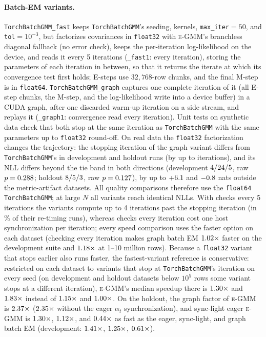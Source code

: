 \documentclass[10pt]{article} %
\newcommand{\egmm}{\textsc{e-GMM}}
\begin{document}
\paragraph{Batch-EM variants.} \texttt{TorchBatchGMM\_fast} keeps \texttt{TorchBatchGMM}'s seeding, kernels, \texttt{max\_iter}$=50$, and \texttt{tol}$=10^{-3}$, but factorizes covariances in \texttt{float32} with \egmm{}'s branchless diagonal fallback (no error check), keeps the per-iteration log-likelihood on the device, and reads it every 5 iterations (\texttt{\_fast1}: every iteration), storing the parameters of each iteration in between, so that it returns the iterate at which its convergence test first holds; E-steps use $32{,}768$-row chunks, and the final M-step is in \texttt{float64}. \texttt{TorchBatchGMM\_graph} captures one complete iteration of it (all E-step chunks, the M-step, and the log-likelihood write into a device buffer) in a CUDA graph, after one discarded warm-up iteration on a side stream, and replays it (\texttt{\_graph1}: convergence read every iteration). Unit tests on synthetic data check that both stop at the same iteration as \texttt{TorchBatchGMM} with the same parameters up to \texttt{float32} round-off. On real data the \texttt{float32} factorization changes the trajectory: the stopping iteration of the graph variant differs from \texttt{TorchBatchGMM}'s in \rXItDiffDev{} development and \rXItDiffHo{} holdout runs (by up to \rXItDiffMax{} iterations), and its NLL differs beyond the tie band in both directions (development $4/24/5$, raw $p = 0.288$; holdout $8/5/3$, raw $p = 0.127$), by up to $+6.1$ and $-0.8$ nats outside the metric-artifact datasets. All quality comparisons therefore use the \texttt{float64} \texttt{TorchBatchGMM}; at large $N$ all variants reach identical NLLs. With checks every 5 iterations the variants compute up to 4 iterations past the stopping iteration (in \rSExtraItersShare\% of their re-timing runs), whereas checks every iteration cost one host synchronization per iteration; every speed comparison uses the faster option on each dataset (checking every iteration makes graph batch EM $1.02\times$ faster on the development suite and $1.18\times$ at 1--10 million rows). Because a \texttt{float32} variant that stops earlier also runs faster, the fastest-variant reference is conservative: restricted on each dataset to variants that stop at \texttt{TorchBatchGMM}'s iteration on every seed (on \rSDevSmallMismatchDs{} development and \rSHoSmallMismatchDs{} holdout datasets below $10^5$ rows some variant stops at a different iteration), \egmm{}'s median speedup there is $1.30\times$ and $1.83\times$ instead of $1.15\times$ and $1.00\times$. On the holdout, the graph factor of \egmm{} is $2.37\times$ ($2.35\times$ without the eager $\alpha_t$ synchronization), and sync-light eager \egmm{} is $1.30\times$, $1.12\times$, and $0.44\times$ as fast as the eager, sync-light, and graph batch EM (development: $1.41\times$, $1.25\times$, $0.61\times$).
\end{document}
